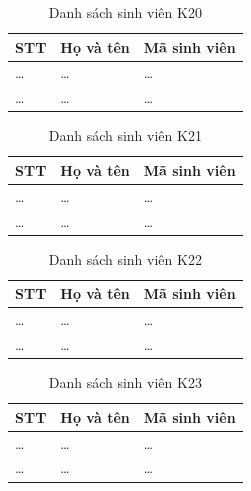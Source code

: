 \documentclass[12pt,a4paper,oneside]{report}
\begin{document}
\begin{table}[H]
  \centering
  \caption{Danh sách sinh viên K20}
  \label{tab:k20}
  \begin{tabularx}{\textwidth}{>{\centering\arraybackslash}p{1.4cm} X >{\centering\arraybackslash}p{4cm}}
    \toprule
    \textbf{STT} & \textbf{Họ và tên} & \textbf{Mã sinh viên} \\
    \midrule
    \dots & \dots & \dots \\
    \dots & \dots & \dots \\
    \bottomrule
  \end{tabularx}
\end{table}

\begin{table}[H]
  \centering
  \caption{Danh sách sinh viên K21}
  \label{tab:k21}
  \begin{tabularx}{\textwidth}{>{\centering\arraybackslash}p{1.4cm} X >{\centering\arraybackslash}p{4cm}}
    \toprule
    \textbf{STT} & \textbf{Họ và tên} & \textbf{Mã sinh viên} \\
    \midrule
    \dots & \dots & \dots \\
    \dots & \dots & \dots \\
    \bottomrule
  \end{tabularx}
\end{table}

\begin{table}[H]
  \centering
  \caption{Danh sách sinh viên K22}
  \label{tab:k22}
  \begin{tabularx}{\textwidth}{>{\centering\arraybackslash}p{1.4cm} X >{\centering\arraybackslash}p{4cm}}
    \toprule
    \textbf{STT} & \textbf{Họ và tên} & \textbf{Mã sinh viên} \\
    \midrule
    \dots & \dots & \dots \\
    \dots & \dots & \dots \\
    \bottomrule
  \end{tabularx}
\end{table}

\begin{table}[H]
  \centering
  \caption{Danh sách sinh viên K23}
  \label{tab:k23}
  \begin{tabularx}{\textwidth}{>{\centering\arraybackslash}p{1.4cm} X >{\centering\arraybackslash}p{4cm}}
    \toprule
    \textbf{STT} & \textbf{Họ và tên} & \textbf{Mã sinh viên} \\
    \midrule
    \dots & \dots & \dots \\
    \dots & \dots & \dots \\
    \bottomrule
  \end{tabularx}
\end{table}
\end{document}
